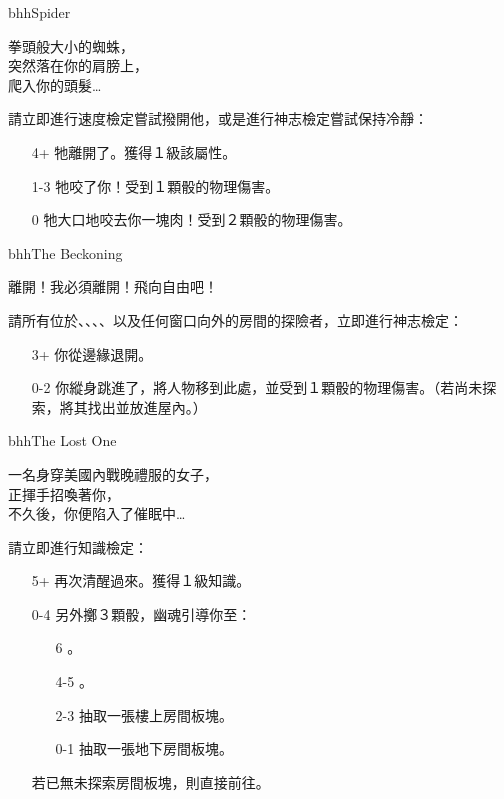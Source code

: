 \linebreak[0]%
\begin{EventCard}{bhh}{Spider}
	\begin{CardStory}
		拳頭般大小的蜘蛛，\\
		突然落在你的肩膀上，\\
		爬入你的頭髮…
	\end{CardStory}
	請立即進行速度檢定嘗試撥開他，或是進行神志檢定嘗試保持冷靜：
	\begin{itemize}
		\item[4+] 牠離開了。獲得１級該屬性。
		\item[1-3] 牠咬了你！受到１顆骰的物理傷害。
		\item[0] 牠大口地咬去你一塊肉！受到２顆骰的物理傷害。
	\end{itemize}
\end{EventCard}%
\linebreak[0]%
\begin{EventCard}{bhh}{The Beckoning}
	\begin{CardStory}
		離開！我必須離開！飛向自由吧！
	\end{CardStory}
	請所有位於、、、、以及任何窗口向外的房間的探險者，立即進行神志檢定：
	\begin{itemize}
		\item[3+] 你從邊緣退開。
		\item[0-2] 你縱身跳進了，將人物移到此處，並受到１顆骰的物理傷害。（若尚未探索，將其找出並放進屋內。）
	\end{itemize}
\end{EventCard}%
\linebreak[0]%
\begin{EventCard}{bhh}{The Lost One}
	\begin{CardStory}
		一名身穿美國內戰晚禮服的女子，\\
		正揮手招喚著你，\\
		不久後，你便陷入了催眠中…
	\end{CardStory}
	\footnotesize
	請立即進行知識檢定：
	\begin{itemize}
		\item[5+] 再次清醒過來。獲得１級知識。
		\item[0-4] 另外擲３顆骰，幽魂引導你至：
		      \begin{itemize}
			      \item[6] 。
			      \item[4-5] 。
			      \item[2-3] 抽取一張樓上房間板塊。
			      \item[0-1] 抽取一張地下房間板塊。
		      \end{itemize}
		      若已無未探索房間板塊，則直接前往。
	\end{itemize}
\end{EventCard}%
